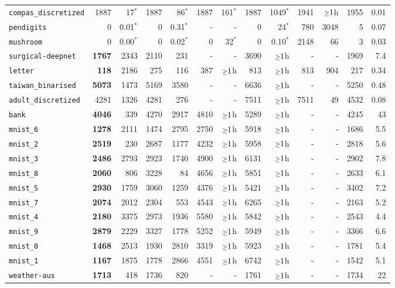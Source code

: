 \begin{tabular}{lrrrrrrrrrrrr}
\texttt{compas\_discretized} & 1887 & 17$^*$ & 1887 & 86$^*$ & 1887 & 161$^*$ & 1887 & 1049$^*$ & 1941 & $\mathsmaller{\geq}1$h & 1955 & 0.01\\
\texttt{pendigits} & 0 & 0.01$^*$ & 0 & 0.31$^*$ & - & - & 0 & 24$^*$ & 780 & 3048 & 5 & 0.07\\
\texttt{mushroom} & 0 & 0.00$^*$ & 0 & 0.02$^*$ & 0 & 32$^*$ & 0 & 0.10$^*$ & 2148 & 66 & 3 & 0.03\\
\texttt{surgical-deepnet} & \textbf{1767} & 2343 & 2110 & 231 & - & - & 3690 & $\mathsmaller{\geq}1$h & - & - & 1969 & 7.4\\
\texttt{letter} & \textbf{118} & 2186 & 275 & 116 & 387 & $\mathsmaller{\geq}1$h & 813 & $\mathsmaller{\geq}1$h & 813 & 904 & 217 & 0.34\\
\texttt{taiwan\_binarised} & \textbf{5073} & 1473 & 5169 & 3580 & - & - & 6636 & $\mathsmaller{\geq}1$h & - & - & 5250 & 0.48\\
\texttt{adult\_discretized} & 4281 & 1326 & 4281 & 276 & - & - & 7511 & $\mathsmaller{\geq}1$h & 7511 & 49 & 4532 & 0.08\\
\texttt{bank} & \textbf{4046} & 339 & 4270 & 2917 & 4810 & $\mathsmaller{\geq}1$h & 5289 & $\mathsmaller{\geq}1$h & - & - & 4245 & 43\\
\texttt{mnist\_6} & \textbf{1278} & 2111 & 1474 & 2795 & 2750 & $\mathsmaller{\geq}1$h & 5918 & $\mathsmaller{\geq}1$h & - & - & 1686 & 5.5\\
\texttt{mnist\_2} & \textbf{2519} & 230 & 2687 & 1177 & 4232 & $\mathsmaller{\geq}1$h & 5958 & $\mathsmaller{\geq}1$h & - & - & 2818 & 5.6\\
\texttt{mnist\_3} & \textbf{2486} & 2793 & 2923 & 1740 & 4900 & $\mathsmaller{\geq}1$h & 6131 & $\mathsmaller{\geq}1$h & - & - & 2902 & 7.8\\
\texttt{mnist\_8} & \textbf{2060} & 806 & 3228 & 84 & 4656 & $\mathsmaller{\geq}1$h & 5851 & $\mathsmaller{\geq}1$h & - & - & 2633 & 6.1\\
\texttt{mnist\_5} & \textbf{2930} & 1759 & 3060 & 1259 & 4376 & $\mathsmaller{\geq}1$h & 5421 & $\mathsmaller{\geq}1$h & - & - & 3402 & 7.2\\
\texttt{mnist\_7} & \textbf{2074} & 2012 & 2304 & 553 & 4543 & $\mathsmaller{\geq}1$h & 6265 & $\mathsmaller{\geq}1$h & - & - & 2163 & 5.2\\
\texttt{mnist\_4} & \textbf{2180} & 3375 & 2973 & 1936 & 5580 & $\mathsmaller{\geq}1$h & 5842 & $\mathsmaller{\geq}1$h & - & - & 2543 & 4.4\\
\texttt{mnist\_9} & \textbf{2879} & 2229 & 3327 & 1778 & 5252 & $\mathsmaller{\geq}1$h & 5949 & $\mathsmaller{\geq}1$h & - & - & 3366 & 6.6\\
\texttt{mnist\_0} & \textbf{1468} & 2513 & 1930 & 2810 & 3319 & $\mathsmaller{\geq}1$h & 5923 & $\mathsmaller{\geq}1$h & - & - & 1781 & 5.4\\
\texttt{mnist\_1} & \textbf{1167} & 1875 & 1778 & 2866 & 4551 & $\mathsmaller{\geq}1$h & 6742 & $\mathsmaller{\geq}1$h & - & - & 1542 & 5.1\\
\texttt{weather-aus} & \textbf{1713} & 418 & 1736 & 820 & - & - & 1761 & $\mathsmaller{\geq}1$h & - & - & 1734 & 22\\
\bottomrule
\end{tabular}
